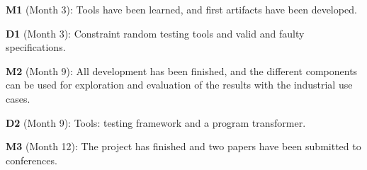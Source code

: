 \documentclass[fleqn,12pt]{article}
\begin{document}
\textbf{M1} (Month 3): Tools have been learned, and first artifacts have been developed.

\textbf{D1} (Month 3): Constraint random testing tools and valid and faulty specifications.


\textbf{M2} (Month 9): All development has been finished, and the different components
can be used for exploration and evaluation of the results with the industrial use cases.

\textbf{D2} (Month 9): Tools: testing framework and a program transformer.

\textbf{M3} (Month 12): The project has finished and two papers have been submitted to conferences.

\newpage
\small

%

\end{document}
